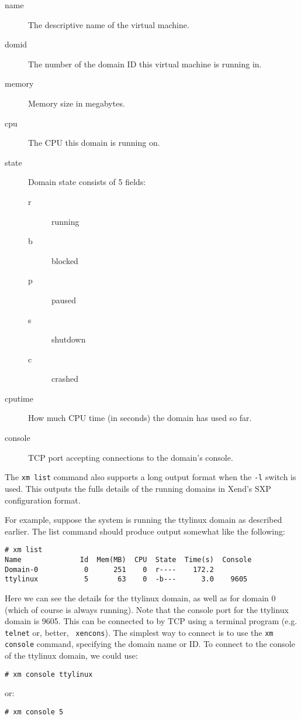 \documentclass[11pt,twoside,final,openright]{xenstyle}
\begin{document}
\begin{description}
\item[name]  The descriptive name of the virtual machine.
\item[domid] The number of the domain ID this virtual machine is running in.
\item[memory] Memory size in megabytes.
\item[cpu]   The CPU this domain is running on.
\item[state] Domain state consists of 5 fields:
  \begin{description}
  \item[r] running
  \item[b] blocked
  \item[p] paused
  \item[s] shutdown
  \item[c] crashed
  \end{description}
\item[cputime] How much CPU time (in seconds) the domain has used so far.
\item[console] TCP port accepting connections to the domain's console.
\end{description}

The {\tt xm list} command also supports a long output format when the
{\tt -l} switch is used.  This outputs the fulls details of the
running domains in Xend's SXP configuration format.

For example, suppose the system is running the ttylinux domain as
described earlier.  The list command should produce output somewhat
like the following:
\begin{verbatim}
# xm list
Name              Id  Mem(MB)  CPU  State  Time(s)  Console
Domain-0           0      251    0  r----    172.2        
ttylinux           5       63    0  -b---      3.0    9605
\end{verbatim}

Here we can see the details for the ttylinux domain, as well as for
domain 0 (which of course is always running).  Note that the console
port for the ttylinux domain is 9605.  This can be connected to by TCP
using a terminal program (e.g. {\tt telnet} or, better, {\tt
xencons}).  The simplest way to connect is to use the {\tt xm console}
command, specifying the domain name or ID.  To connect to the console
of the ttylinux domain, we could use:
\begin{verbatim}
# xm console ttylinux
\end{verbatim}
or:
\begin{verbatim}
# xm console 5
\end{verbatim}
\end{document}
